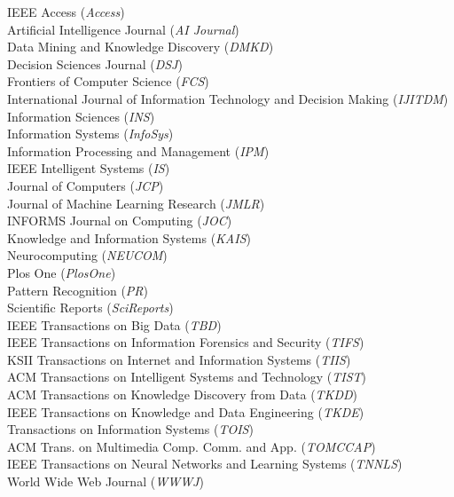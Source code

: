 \documentclass[10pt]{article}
\newenvironment{myindentpar}[1]%
{\begin{list}{}%
         {\setlength{\leftmargin}{#1}}%
         \item[]%
}
{\end{list}}
\newcounter{list}
\begin{document}
\begin{myindentpar}{0.75cm}
{IEEE Access (\textit{Access}) \\
Artificial Intelligence Journal (\textit{AI Journal}) \\
Data Mining and Knowledge Discovery (\textit{DMKD}) \\
Decision Sciences Journal (\textit{DSJ}) \\
Frontiers of Computer Science (\textit{FCS}) \\
International Journal of Information Technology and Decision Making (\textit{IJITDM}) \\
Information Sciences (\textit{INS}) \\
Information Systems (\textit{InfoSys}) \\
Information Processing and Management (\textit{IPM}) \\
IEEE Intelligent Systems (\textit{IS}) \\
Journal of Computers (\textit{JCP}) \\
Journal of Machine Learning Research (\textit{JMLR}) \\
INFORMS Journal on Computing (\textit{JOC}) \\
Knowledge and Information Systems (\textit{KAIS}) \\
Neurocomputing (\textit{NEUCOM}) \\
Plos One (\textit{PlosOne}) \\
Pattern Recognition (\textit{PR}) \\
Scientific Reports (\textit{SciReports}) \\
IEEE Transactions on Big Data (\textit{TBD}) \\
IEEE Transactions on Information Forensics and Security (\textit{TIFS}) \\
KSII Transactions on Internet and Information Systems (\textit{TIIS}) \\
ACM Transactions on Intelligent Systems and Technology (\textit{TIST}) \\
ACM Transactions on Knowledge Discovery from Data (\textit{TKDD}) \\
IEEE Transactions on Knowledge and Data Engineering (\textit{TKDE}) \\
Transactions on Information Systems (\textit{TOIS}) \\
ACM Trans. on Multimedia Comp. Comm. and App. (\textit{TOMCCAP}) \\
IEEE Transactions on Neural Networks and Learning Systems (\textit{TNNLS}) \\
World Wide Web Journal (\textit{WWWJ})

}


\end{myindentpar}
\end{document}
